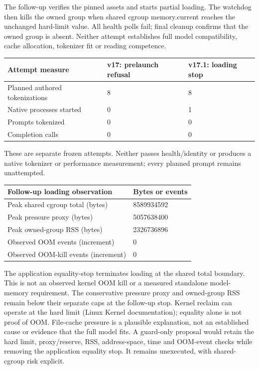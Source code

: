 \documentclass[10pt,a4paper]{article}
\begin{document}
The follow-up verifies the pinned assets and starts partial loading. The watchdog then kills the owned group when shared cgroup memory.current reaches the unchanged hard-limit value. All health polls fail; final cleanup confirms that the owned group is absent. Neither attempt establishes full model compatibility, cache allocation, tokenizer fit or reading competence.

\begin{longtable}{@{}p{}p{}p{}@{}}\toprule
\textbf{Attempt measure} & \textbf{v17: prelaunch refusal} & \textbf{v17.1: loading stop} \\ \midrule\endhead
Planned authored tokenizations & 8 & 8 \\
Native processes started & 0 & 1 \\
Prompts tokenized & 0 & 0 \\
Completion calls & 0 & 0 \\
\bottomrule\end{longtable}
{\small These are separate frozen attempts. Neither passes health/identity or produces a native tokenizer or performance measurement; every planned prompt remains unattempted.}
\begin{longtable}{@{}p{}p{}@{}}\toprule
\textbf{Follow-up loading observation} & \textbf{Bytes or events} \\ \midrule\endhead
Peak shared cgroup total (bytes) & 8589934592 \\
Peak pressure proxy (bytes) & 5057638400 \\
Peak owned-group RSS (bytes) & 2326736896 \\
Observed OOM events (increment) & 0 \\
Observed OOM-kill events (increment) & 0 \\
\bottomrule\end{longtable}
{\small The application equality-stop terminates loading at the shared total boundary. This is not an observed kernel OOM kill or a measured standalone model-memory requirement.}
The conservative pressure proxy and owned-group RSS remain below their separate caps at the follow-up stop. Kernel reclaim can operate at the hard limit (Linux Kernel documentation); equality alone is not proof of OOM. File-cache pressure is a plausible explanation, not an established cause or evidence that the full model fits. A guard-only proposal would retain the hard limit, proxy/reserve, RSS, address-space, time and OOM-event checks while removing the application equality stop. It remains unexecuted, with shared-cgroup risk explicit.
\end{document}
